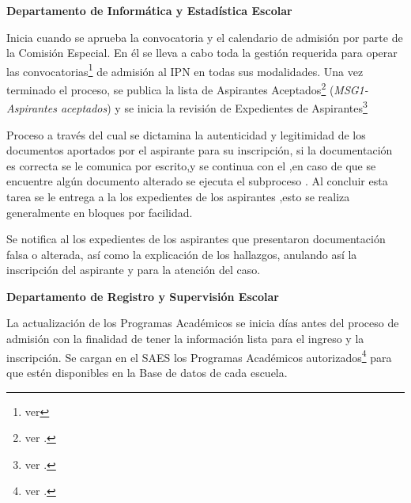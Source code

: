\begin{PDescripcion}
	
	\Ppaso \textbf{Departamento de Informática y Estadística Escolar}
	
	\begin{enumerate}
		 Inicia cuando se aprueba la convocatoria y el calendario de admisión por parte de la Comisión Especial. En él se lleva a cabo toda la gestión requerida para operar las convocatorias\footnote{ver } de admisión al IPN en todas sus modalidades. Una vez terminado el proceso, se publica la lista de Aspirantes Aceptados\footnote{ver .} ({\em MSG1-Aspirantes aceptados}) y se inicia la revisión de Expedientes de Aspirantes\footnote{ver .}
		
		Proceso a través del cual se dictamina la autenticidad y legitimidad de los documentos aportados por el aspirante para su inscripción, si la documentación es correcta se le comunica por escrito,y se continua con el ,en caso de que se encuentre algún documento alterado se ejecuta el subproceso . Al concluir esta tarea se le entrega a la  los expedientes de los aspirantes ,esto se realiza generalmente en bloques por facilidad.
		
		 Se notifica al  los expedientes de los aspirantes que presentaron documentación falsa o alterada, así como la explicación de los hallazgos, anulando así la inscripción del aspirante y para la atención del caso.
	\end{enumerate}
	
	\Ppaso \textbf{Departamento de Registro y Supervisión Escolar}
	
	\begin{enumerate}
		 La actualización de los Programas Académicos se inicia días antes del proceso de admisión con la finalidad de tener la información lista para el ingreso y la inscripción. Se cargan en el SAES los Programas Académicos autorizados\footnote{ver .} para que estén disponibles en la Base de datos de cada escuela.
		

\end{enumerate}
\end{PDescripcion}
